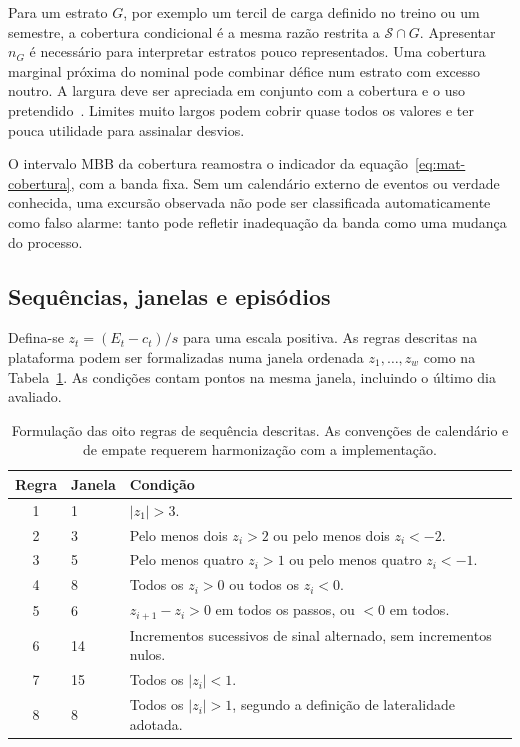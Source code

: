 Para um estrato $G$, por exemplo um tercil de carga definido no treino ou um semestre, a cobertura condicional é a mesma razão restrita a $\mathcal S\cap G$. Apresentar $n_G$ é necessário para interpretar estratos pouco representados. Uma cobertura marginal próxima do nominal pode combinar défice num estrato com excesso noutro. A largura deve ser apreciada em conjunto com a cobertura e o uso pretendido~\parencite{Gneiting2007}. Limites muito largos podem cobrir quase todos os valores e ter pouca utilidade para assinalar desvios.

O intervalo MBB da cobertura reamostra o indicador da equação~\ref{eq:mat-cobertura}, com a banda fixa. Sem um calendário externo de eventos ou verdade conhecida, uma excursão observada não pode ser classificada automaticamente como falso alarme: tanto pode refletir inadequação da banda como uma mudança do processo.

\subsection{Sequências, janelas e episódios}
\label{sec:mat-regras}
Defina-se $z_t=(E_t-c_t)/s$ para uma escala positiva. As regras descritas na plataforma podem ser formalizadas numa janela ordenada $z_1,\ldots,z_w$ como na Tabela~\ref{tab:mat-regras}. As condições contam pontos na mesma janela, incluindo o último dia avaliado.

\begin{table}[htbp]
\centering\small
\caption{Formulação das oito regras de sequência descritas. As convenções de calendário e de empate requerem harmonização com a implementação.}
\label{tab:mat-regras}
\begin{tabularx}{\linewidth}{@{}clX@{}}\toprule
Regra & Janela & Condição\\\midrule
1 & 1 & $|z_1|>3$.\\
2 & 3 & Pelo menos dois $z_i>2$ ou pelo menos dois $z_i<-2$.\\
3 & 5 & Pelo menos quatro $z_i>1$ ou pelo menos quatro $z_i<-1$.\\
4 & 8 & Todos os $z_i>0$ ou todos os $z_i<0$.\\
5 & 6 & $z_{i+1}-z_i>0$ em todos os passos, ou $<0$ em todos.\\
6 & 14 & Incrementos sucessivos de sinal alternado, sem incrementos nulos.\\
7 & 15 & Todos os $|z_i|<1$.\\
8 & 8 & Todos os $|z_i|>1$, segundo a definição de lateralidade adotada.\\\bottomrule
\end{tabularx}
\end{table}

